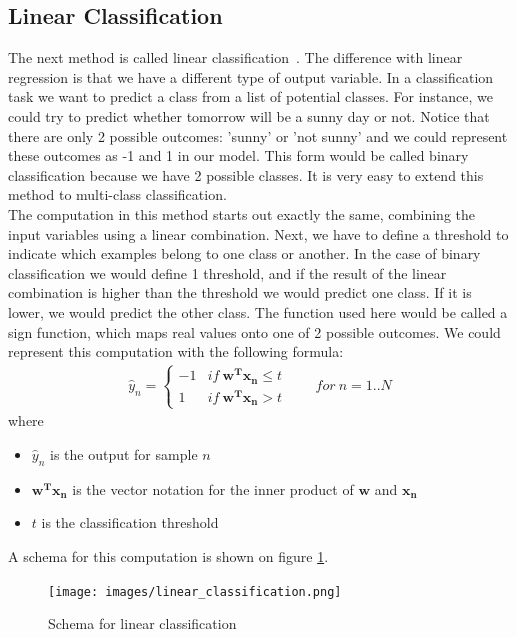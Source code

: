 \subsection{Linear Classification}
\label{subsec:glm-linear-classification}
The next method is called linear classification~\cite{caltechmachinelearning}\cite{wikiclassification}. The difference with linear regression is that we have a different type of output variable. In a classification task we want to predict a class from a list of potential classes. For instance, we could try to predict whether tomorrow will be a sunny day or not. Notice that there are only 2 possible outcomes: 'sunny' or 'not sunny' and we could represent these outcomes as -1 and 1 in our model. This form would be called binary classification because we have 2 possible classes. It is very easy to extend this method to multi-class classification.\\
The computation in this method starts out exactly the same, combining the input variables using a linear combination. Next, we have to define a threshold to indicate which examples belong to one class or another. In the case of binary classification we would define 1 threshold, and if the result of the linear combination is higher than the threshold we would predict one class. If it is lower, we would predict the other class. The function used here would be called a sign function, which maps real values onto one of 2 possible outcomes. We could represent this computation with the following formula: 
\begin{equation}
\begin{split}
\hat{y}_{n} =
\begin{cases} 
-1 & if\ \bm{w^{T}x_{n}} \leq t \\
1 & if\ \bm{w^{T}x_{n}} > t 
\end{cases}
\qquad for\ n=1..N
\end{split}
\end{equation}
where
\begin{itemize}
	\item $\hat{y}_{n}$ is the output for sample $n$
	\item $\bm{w^{T}x_{n}}$ is the vector notation for the inner product of $\bm{w}$ and $\bm{x_{n}}$
	\item $t$ is the classification threshold
\end{itemize}
A schema for this computation is shown on figure \ref{fig:glm-linear-classification}.
\begin{figure}
	\centering
	\texttt{[image: images/linear\_classification.png]}
	\caption{Schema for linear classification}
	\label{fig:glm-linear-classification}
\end{figure}
